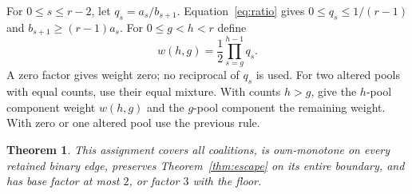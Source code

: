 \documentclass[11pt]{article}
\newtheorem{theorem}{Theorem}[section]
\theoremstyle{definition}\newtheorem{definition}[theorem]{Definition}
\theoremstyle{remark}\newtheorem{remark}[theorem]{Remark}
\begin{document}
For $0\le s\le r-2$, let $q_s=a_s/b_{s+1}$. Equation~\eqref{eq:ratio}
gives $0\le q_s\le1/(r-1)$ and $b_{s+1}\ge(r-1)a_s$.
For $0\le g<h<r$ define
\[
 w(h,g)=\frac12\prod_{s=g}^{h-1}q_s.
\]
A zero factor gives weight zero; no reciprocal of $q_s$ is used.
For two altered pools with equal counts, use their equal mixture. With counts
$h>g$, give the $h$-pool component weight $w(h,g)$ and the $g$-pool component
the remaining weight. With zero or one altered pool use the previous rule.

\begin{theorem}\label{thm:binary-two}
This assignment covers all coalitions, is own-monotone on every retained
binary edge, preserves Theorem~\ref{thm:escape} on its entire boundary,
and has base factor at most $2$, or factor $3$ with the floor.
\end{theorem}
\end{document}
